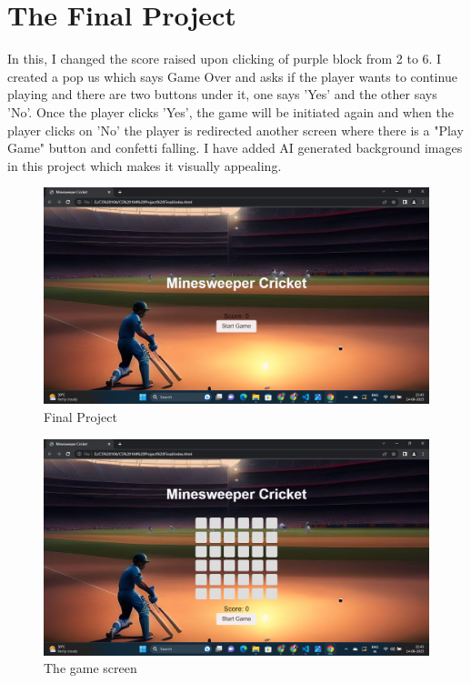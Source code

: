 \documentclass{article}
\begin{document}
\section{The Final Project} In this, I changed the score raised upon clicking of purple block from 2 to 6. I created a pop us which says Game Over and asks if the player wants to continue playing and there are two buttons under it, one says 'Yes' and the other says 'No'. Once the player clicks 'Yes', the game will be initiated again and when the player clicks on 'No' the player is redirected another screen where there is a "Play Game" button and confetti falling. I have added AI generated background images in this project which makes it visually appealing. 
\begin{figure}
[H]
   \includegraphics[width=\linewidth]{Screenshot (227).png}
   \caption{Final Project}
\end{figure}
\begin{figure}
[H]
   \includegraphics[width=\linewidth]{Screenshot (228).png}
   \caption{The game screen}
\end{figure}
\end{document}
